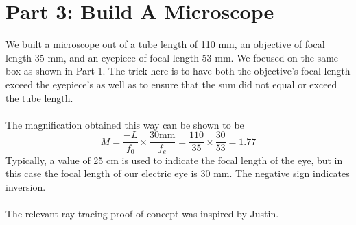 \documentclass[10pt,a4paper]{article}
\begin{document}
\section*{Part 3: Build A Microscope}
We built a microscope out of a tube length of 110 mm, an objective of focal length 35 mm, and an eyepiece of focal length 53 mm. We focused on the same box as shown in Part 1. The trick here is to have both the objective's focal length exceed the eyepiece's as well as to ensure that the sum did not equal or exceed the tube length.\\
\\
The magnification obtained this way can be shown to be $$M = \dfrac{-L}{f_{0}}\times\dfrac{30\mathrm{mm}}{f_{e}} = \dfrac{110}{35}\times\dfrac{30}{53} = 1.77$$ Typically, a value of 25 cm is used to indicate the focal length of the eye, but in this case the focal length of our electric eye is 30 mm. The negative sign indicates inversion.\\
\\
The relevant ray-tracing proof of concept was inspired by Justin.
\end{document}
